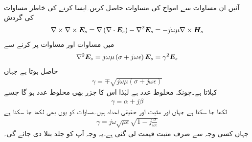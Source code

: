 آئیں ان مساوات سے امواج کی مساوات حاصل کریں۔ایسا کرنے کی خاطر مساوات  کی گردش
\begin{align*}
\nabla \times \nabla \times {\ensuremath{{\boldsymbol{E}}}}_s=\nabla \left(\nabla \cdot {\ensuremath{{\boldsymbol{E}}}}_s \right)-\nabla^2 {{\boldsymbol{E}}}_s=-j \omega \mu  \nabla \times {\ensuremath{{\boldsymbol{H}}}}_s
\end{align*}
میں مساوات  اور مساوات  پر کرنے سے
\begin{align}\label{مساوات_موج_ہلم_ہولٹز_مساوات}
\nabla^2 {{\boldsymbol{E}}}_s=j \omega \mu  \left(\sigma +j \omega \epsilon \right) {{\boldsymbol{E}}}_s =\gamma^2 {{\boldsymbol{E}}}_s
\end{align}
حاصل ہوتا ہے  جہاں 
\begin{align}\label{مساوات_موج_حرکی_مستقل_الف}
\gamma=\mp \sqrt{j \omega \mu  \left(\sigma +j \omega \epsilon \right)}
\end{align}
 کہلاتا ہے۔چونکہ  مخلوط عدد ہے لہٰذا اس کا جزر  بھی مخلوط عدد ہو گا جسے
\begin{align}
\gamma=\alpha+j \beta
\end{align}
لکھا جا سکتا ہے جہاں  اور  مثبت اور حقیقی اعداد ہیں۔مساوات  کو یوں بھی لکھا جا سکتا ہے
\begin{align}\label{مساوات_موج_حرکی_مستقل_ب}
\gamma=j \omega \sqrt{\mu \epsilon }\sqrt{1-j \frac{\sigma}{\omega \epsilon}}
\end{align}
جہاں کسی وجہ سے صرف مثبت قیمت لی گئی ہے۔یہ وجہ آپ کو جلد بتلا دی جائے گی۔

